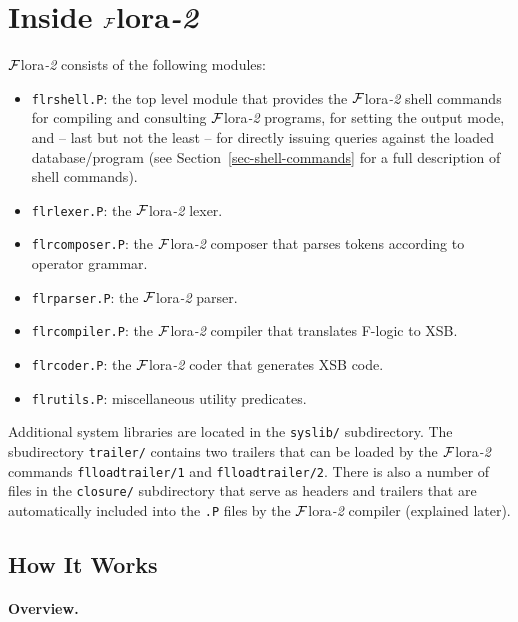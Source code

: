 \documentclass[11pt]{article}
\newcommand{\FLORA}{{\mbox{${\cal F}${\sc lora}\rm\emph{-2}}}\xspace}
\newcommand{\fl}{\mbox{F-logic}\xspace}
\begin{document}
\section{Inside \FLORA}


\FLORA consists of the following modules:
\begin{itemize}
\item \texttt{flrshell.P}: the top level module that provides the \FLORA shell
  commands for compiling and consulting \FLORA programs, for setting the output mode,
  and -- last but not the least -- for directly issuing queries against the loaded
  database/program (see Section~\ref{sec-shell-commands} for a full
  description of shell commands).
\item \texttt{flrlexer.P}: the \FLORA lexer.
\item \texttt{flrcomposer.P}: the \FLORA composer that parses tokens according to operator grammar.
\item \texttt{flrparser.P}: the \FLORA parser.
\item \texttt{flrcompiler.P}: the \FLORA compiler that translates \fl to XSB.
\item \texttt{flrcoder.P}: the \FLORA coder that generates XSB code.
\item \texttt{flrutils.P}: miscellaneous utility predicates.
\end{itemize}
Additional system libraries are located in the {\tt syslib/} subdirectory.
The sbudirectory {\tt trailer/} contains two trailers that can be
loaded by the \FLORA commands {\tt flloadtrailer/1} and \linebreak
{\tt flloadtrailer/2}. There
is also a number of files in the {\tt closure/} subdirectory that serve as
headers and trailers that are automatically included into the {\tt .P} files by the
\FLORA compiler (explained later).


\subsection{How It Works}


\paragraph{Overview.}
\end{document}
